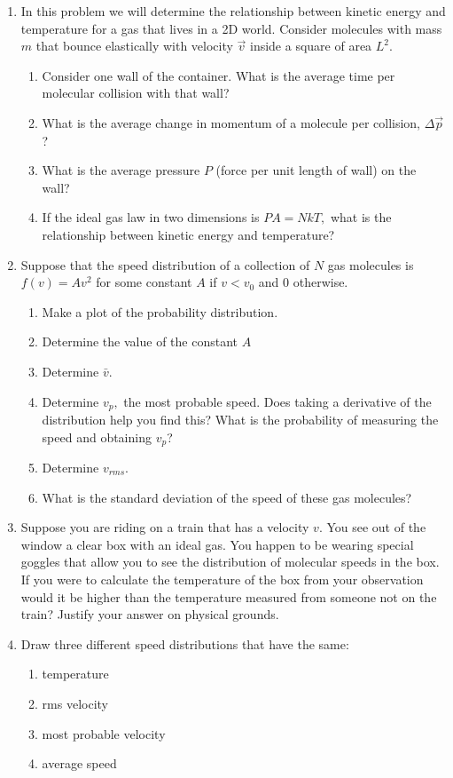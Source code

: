 \documentclass[12pt]{book}
\begin{document}
\begin{enumerate}
 \item In this problem we will determine the relationship between kinetic energy and temperature for a gas that lives in a 2D world. Consider molecules with mass $m$ that bounce elastically with velocity $\vec{v}$ inside a square of area $L^2.$

\begin{enumerate}
 \item Consider one wall of the container. What is the average time per molecular collision with that wall?
 \item What is the average change in momentum of a molecule per collision, $\Delta \vec{p}$?
 \item What is the average pressure $P$ (force per unit length of wall) on the wall?
 \item If the ideal gas law in two dimensions is $PA = NkT,$ what is the relationship between kinetic energy and temperature?
\end{enumerate}
                                                                                                                                                                                  \item Suppose that the speed distribution of a collection of $N$ gas molecules is $f(v) = A v^2$ for some constant $A$ if $v<v_0$ and 0 otherwise.
\begin{enumerate}
\item Make a plot of the probability distribution.
\item Determine the value of the constant $A$
\item Determine $\bar{v}.$
\item Determine $v_p,$ the most probable speed. Does taking a derivative of the distribution help you find this? What is the probability of measuring the speed and obtaining $v_p$?
\item Determine $v_{rms}$.
\item What is the standard deviation of the speed of these gas molecules?
\end{enumerate}
\item Suppose you are riding on a train that has a velocity $v$. You see out of the window a clear box
with an ideal gas. You happen to be wearing special goggles that allow you to see the distribution
of molecular speeds in the box. If you were to calculate the temperature of the box from your
observation would it be higher than the temperature measured from someone not on the train? Justify your
answer on physical grounds.

\pagebreak
\item Draw three different speed distributions that have the same:
\begin{enumerate}
\item temperature
\item rms velocity
\item most probable velocity
\item average speed
\end{enumerate}
\end{enumerate}
\end{document}
